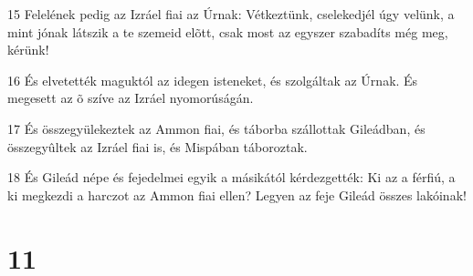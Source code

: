 \par 15 Felelének pedig az Izráel fiai az Úrnak: Vétkeztünk, cselekedjél úgy velünk, a mint jónak látszik a te szemeid elõtt, csak most az egyszer szabadíts még meg, kérünk!
\par 16 És elvetették maguktól az idegen isteneket, és szolgáltak az Úrnak. És megesett az õ szíve az Izráel nyomorúságán.
\par 17 És összegyülekeztek az Ammon fiai, és táborba szállottak Gileádban, és összegyûltek az Izráel fiai is, és Mispában táboroztak.
\par 18 És Gileád népe és fejedelmei egyik a másikától kérdezgették: Ki az a férfiú, a ki megkezdi a harczot az Ammon fiai ellen? Legyen az feje Gileád összes lakóinak!

\chapter{11}

